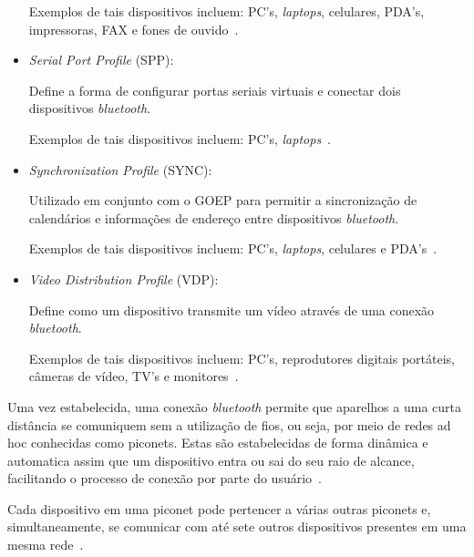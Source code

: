 \begin{itemize}
	Exemplos de tais dispositivos incluem: PC's, \emph{laptops}, celulares, PDA's, impressoras, FAX e fones de ouvido~\cite{bluetoothprofilesSDAP}.
	\item \emph{Serial Port Profile} (SPP): 

	Define a forma de configurar portas seriais virtuais e conectar dois dispositivos \emph{bluetooth}.

	Exemplos de tais dispositivos incluem: PC's, \emph{laptops}~\cite{bluetoothprofilesSPP}.
	\item \emph{Synchronization Profile} (SYNC): 

	Utilizado em conjunto com o GOEP para permitir a sincronização de calendários e informações de endereço entre dispositivos \emph{bluetooth}.

	Exemplos de tais dispositivos incluem: PC's, \emph{laptops}, celulares e PDA's~\cite{bluetoothprofilesSYNC}.
	\item \emph{Video Distribution Profile} (VDP): 

	Define como um dispositivo transmite um vídeo através de uma conexão \emph{bluetooth}.

	Exemplos de tais dispositivos incluem: PC's, reprodutores digitais portáteis, câmeras de vídeo, TV's e monitores~\cite{bluetoothprofilesVDP}.
\end{itemize}

Uma vez estabelecida, uma conexão \emph{bluetooth} permite que aparelhos a uma curta distância se comuniquem sem a utilização de fios, ou seja, por meio de redes ad hoc conhecidas como piconets. Estas são estabelecidas de forma dinâmica e automatica assim que um dispositivo entra ou sai do seu raio de alcance, facilitando o processo de conexão por parte do usuário~\cite{bluetoothoverview}.

Cada dispositivo em uma piconet pode pertencer a várias outras piconets e, simultaneamente, se comunicar com até sete outros dispositivos presentes em uma mesma rede~\cite{bluetoothoverview}.

